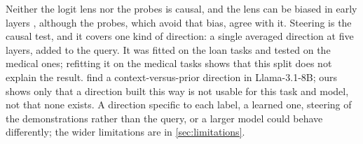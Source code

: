 Neither the logit lens nor the probes is causal, and the lens can be biased in early layers \citep{belrose2023eliciting}, although the probes, which avoid that bias, agree with it.
Steering is the causal test, and it covers one kind of direction: a single averaged direction at five layers, added to the query.
It was fitted on the loan tasks and tested on the medical ones; refitting it on the medical tasks shows that this split does not explain the result.
\citet{minder2025controllable} find a context-versus-prior direction in Llama-3.1-8B; ours shows only that a direction built this way is not usable for this task and model, not that none exists.
A direction specific to each label, a learned one, steering of the demonstrations rather than the query, or a larger model could behave differently; the wider limitations are in \autoref{sec:limitations}.
